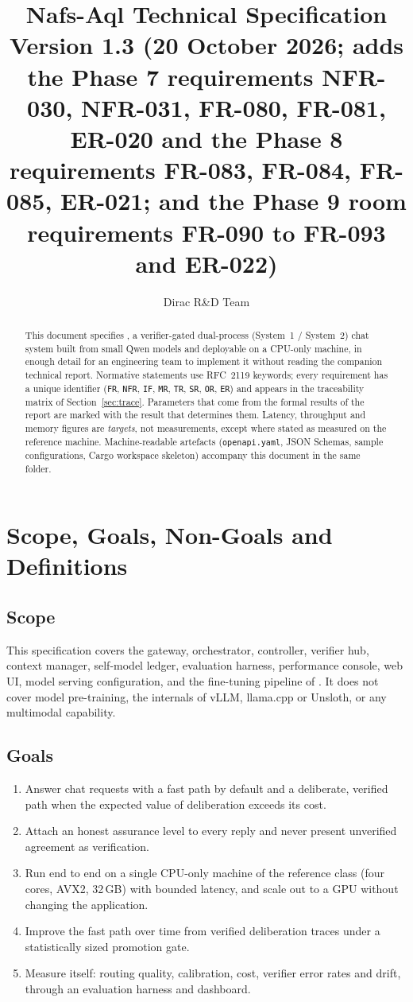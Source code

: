 \documentclass[11pt,a4paper]{article}
\title{\textbf{Nafs-Aql Technical Specification}\\[4pt]\large Version 1.3 (20 October 2026; adds the Phase 7 requirements NFR-030, NFR-031, FR-080, FR-081, ER-020 and the Phase 8 requirements FR-083, FR-084, FR-085, ER-021; and the Phase 9 room requirements FR-090 to FR-093 and ER-022)}
\author{Dirac R\&D Team}
\date{}
\begin{document}
\maketitle
\begin{abstract}\noindent
This document specifies \Sys, a verifier-gated dual-process (System~1 / System~2) chat system built from small Qwen models and deployable on a CPU-only machine, in enough detail for an engineering team to implement it without reading the companion technical report. Normative statements use RFC~2119 keywords; every requirement has a unique identifier (\texttt{FR}, \texttt{NFR}, \texttt{IF}, \texttt{MR}, \texttt{TR}, \texttt{SR}, \texttt{OR}, \texttt{ER}) and appears in the traceability matrix of Section~\ref{sec:trace}. Parameters that come from the formal results of the report are marked with the result that determines them. Latency, throughput and memory figures are \emph{targets}, not measurements, except where stated as measured on the reference machine. Machine-readable artefacts (\texttt{openapi.yaml}, JSON Schemas, sample configurations, Cargo workspace skeleton) accompany this document in the same folder.
\end{abstract}
\tableofcontents
\clearpage

\section{Scope, Goals, Non-Goals and Definitions}
\subsection{Scope}
This specification covers the gateway, orchestrator, controller, verifier hub, context manager, self-model ledger, evaluation harness, performance console, web UI, model serving configuration, and the fine-tuning pipeline of \Sys. It does not cover model pre-training, the internals of vLLM, llama.cpp or Unsloth, or any multimodal capability.
\subsection{Goals}
\begin{enumerate}[label=G\arabic*.]
\item Answer chat requests with a fast path by default and a deliberate, verified path when the expected value of deliberation exceeds its cost.
\item Attach an honest assurance level to every reply and never present unverified agreement as verification.
\item Run end to end on a single CPU-only machine of the reference class (four cores, AVX2, 32\,GB) with bounded latency, and scale out to a GPU without changing the application.
\item Improve the fast path over time from verified deliberation traces under a statistically sized promotion gate.
\item Measure itself: routing quality, calibration, cost, verifier error rates and drift, through an evaluation harness and dashboard.
\end{enumerate}
\end{document}
